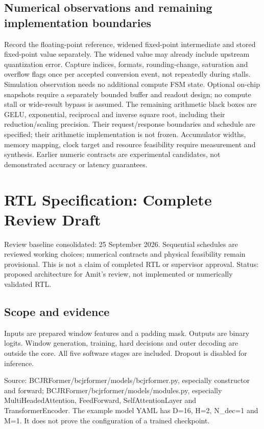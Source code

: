 \documentclass[11pt,a4paper]{article}
\begin{document}
\subsection{Numerical observations and remaining implementation boundaries}
Record the floating-point reference, widened fixed-point intermediate and stored fixed-point value separately. The widened value may already include upstream quantization error. Capture indices, formats, rounding-change, saturation and overflow flags once per accepted conversion event, not repeatedly during stalls. Simulation observation needs no additional compute FSM state. Optional on-chip snapshots require a separately bounded buffer and readout design; no compute stall or wide-result bypass is assumed.
The remaining arithmetic black boxes are GELU, exponential, reciprocal and inverse square root, including their reduction/scaling precision. Their request/response boundaries and schedule are specified; their arithmetic implementation is not frozen. Accumulator widths, memory mapping, clock target and resource feasibility require measurement and synthesis. Earlier numeric contracts are experimental candidates, not demonstrated accuracy or latency guarantees.


\section{RTL Specification: Complete Review Draft}

Review baseline consolidated: 25 September 2026. Sequential schedules are reviewed working choices; numerical contracts and physical feasibility remain provisional. This is not a claim of completed RTL or supervisor approval.
Status: proposed architecture for Amit's review, not implemented or numerically validated RTL.

\subsection{Scope and evidence}

Inputs are prepared window features and a padding mask. Outputs are binary logits. Window generation, training, hard decisions and outer decoding are outside the core. All five software stages are included. Dropout is disabled for inference.

Source: BCJRFormer/bcjrformer/models/bcjrformer.py, especially constructor and forward; BCJRFormer/bcjrformer/models/modules.py, especially MultiHeadedAttention, FeedForward, SelfAttentionLayer and TransformerEncoder. The example model YAML has D=16, H=2, N\_dec=1 and M=1. It does not prove the configuration of a trained checkpoint.
\end{document}
